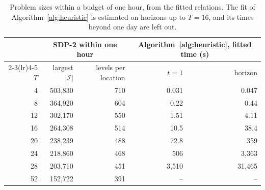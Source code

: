 \begin{table}[H]
\centering
\footnotesize
\caption{Problem sizes within a budget of one hour, from the fitted relations. The fit of Algorithm~\ref{alg:heuristic} is estimated on horizons up to $T=16$, and its times beyond one day are left out.}
\label{tab:comp.budget}
\renewcommand{\arraystretch}{0.9}
\begin{tabular}{rrrrr}
\toprule
 & \multicolumn{2}{c}{SDP-2 within one hour} & \multicolumn{2}{c}{Algorithm~\ref{alg:heuristic}, fitted time (s)} \\
\cmidrule(lr){2-3}\cmidrule(lr){4-5}
$T$ & largest $|\mathcal{I}|$ & levels per location & $t=1$ & horizon \\
\midrule
4 & 503,830 & 710 & 0.031 & 0.047 \\
8 & 364,920 & 604 & 0.22 & 0.44 \\
12 & 302,170 & 550 & 1.51 & 4.11 \\
16 & 264,308 & 514 & 10.5 & 38.4 \\
20 & 238,239 & 488 & 72.8 & 359 \\
24 & 218,860 & 468 & 506 & 3,363 \\
28 & 203,710 & 451 & 3,510 & 31,465 \\
52 & 152,722 & 391 & -- & -- \\
\bottomrule
\end{tabular}
\end{table}
